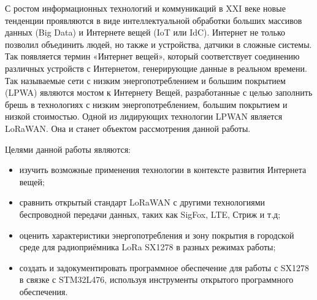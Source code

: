 \Introduction

С ростом информационных технологий и коммуникаций в XXI веке новые тенденции проявляются в виде интеллектуальной обработки больших массивов данных (Big Data) и Интернете вещей (IoT или IdC). 
Интернет не только позволил объединить людей, но также и устройства, датчики в сложные системы. 
Так появляется термин «Интернет вещей», который соответствует соединению различных устройств с Интернетом, генерирующие данные в реальном времени. 
Так называемые сети с низким энергопотреблением и большим покрытием (LPWA) являются мостом к Интернету Вещей, разработанные с целью заполнить брешь в технологиях с низким энергопотреблением, большим покрытием и низкой стоимостью. 
Одной из лидирующих технологии LPWAN является LoRaWAN. Она и станет объектом рассмотрения данной работы.

Целями данной работы являются:


\begin{itemize}
	\item изучить возможные применения технологии в контексте развития Интернета вещей;
	\item сравнить открытый стандарт LoRaWAN с другими технологиями беспроводной передачи данных, таких как SigFox, LTE, Стриж и т.д;
	\item оценить характеристики энергопотребления и зону покрытия в городской среде для радиоприёмника LoRa SX1278 в разных режимах работы;
	\item создать и задокументировать программное обеспечение для работы с SX1278 в связке с STM32L476, используя инструменты открытого программного обеспечения.
\end{itemize}



